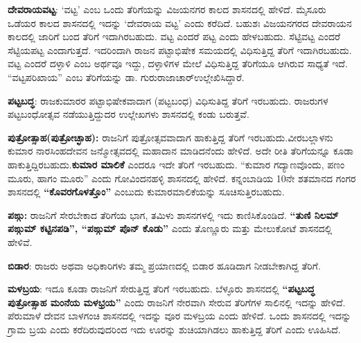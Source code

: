 \vskip 3pt

\textbf{ದೇವರಾಯವಟ್ಟ}: ‘ವಟ್ಟ’ ಎಂಬ ಒಂದು ತೆರಿಗೆಯನ್ನು ವಿಜಯನಗರ ಕಾಲದ ಶಾಸನದಲ್ಲಿ ಹೇಳಿದೆ. ಮೈಸೂರು ಒಡೆಯರ ಕಾಲದ ಶಾಸನದಲ್ಲಿ ಇದನ್ನು ‘ದೇವರಾಯ ವಟ್ಟ’ ಎಂದು ಕರೆದಿದೆ. ಬಹುಶಃ ವಿಜಯನಗರದ ದೇವರಾಯನ ಕಾಲದಲ್ಲಿ ಜಾರಿಗೆ ಬಂದ ತೆರಿಗೆ ಇದಾಗಿರಬಹುದು. ವಟ್ಟ ಎಂದರೆ ಪಟ್ಟ ಎಂದು ಹೇಳಬಹುದು. ಸೆಟ್ಟಿವಟ್ಟ ಎಂದರೆ ಸೆಟ್ಟಿಯಪಟ್ಟ ಎಂದಾಗುತ್ತದೆ. ಇದರಿಂದಾಗಿ ರಾಜನ ಪಟ್ಟಾಭಿಷೇಕ ಸಮಯದಲ್ಲಿ ವಿಧಿಸುತ್ತಿದ್ದ ತೆರಿಗೆ ಇದಾಗಿರಬಹುದು. ವಟ್ಟ ಎಂದರೆ ದಳ್ಳಾಳಿ ಎಂಬ ಅರ್ಥವೂ ಇದ್ದು, ದಳ್ಳಾಳಿಗಳ ಮೇಲೆ ವಿಧಿಸುತ್ತಿದ್ದ ತೆರಿಗೆಯೂ ಆಗಿರುವ ಸಾಧ್ಯತೆ ಇದೆ. “ವಟ್ಟಪರಿಖಾಯ” ಎಂಬ ತೆರಿಗೆಯನ್ನು ಡಾ. ಗುರುರಾಜಾಚಾರ್​ ಉಲ್ಲೇಖಿಸಿದ್ದಾರೆ.

\vskip 3pt

\textbf{ಪಟ್ಟಬದ್ಧ}: ರಾಜಕುಮಾರರ ಪಟ್ಟಾಭಿಷೇಕವಾದಾಗ (ಪಟ್ಟಬಂಧ) ವಿಧಿಸುತಿದ್ದ ತೆರಿಗೆ ಇರಬಹುದು. ರಾಜರುಗಳ ಪಟ್ಟಬಂಧೋತ್ಸವ ನಡೆಯುತ್ತಿದ್ದುದರ ಉಲ್ಲೇಖಗಳು ಶಾಸನದಲ್ಲಿ ಕಂಡು ಬರುತ್ತವೆ.

\vskip 3pt

\textbf{ಪುತ್ರೋತ್ಸಾಹ}\textbf{(ಪುತ್ರೋಚ್ಛಾಹ):} ರಾಜನಿಗೆ ಪುತ್ರೋತ್ಸವವಾದಾಗ ಹಾಕುತ್ತಿದ್ದ ತೆರಿಗೆ ಇರಬಹುದು.\break ವೀರಬಲ್ಲಾಳನು ಕುಮಾರ ನಾರಸಿಂಹದೇವನ ಜನ್ಮೋತ್ಸವದಲ್ಲಿ ಮಹಾದಾನ ಮಾಡಿದನೆಂದು ಹೇಳಿದೆ. ಅದೇ ರೀತಿ ತೆರಿಗೆಯನ್ನೂ ಕೂಡಾ ಹಾಕುತ್ತಿದ್ದಿರಬಹುದು.\textbf{ಕುಮಾರ ಮಾಲಿಕೆ} ಎಂದರೂ ಇದೇ ತೆರಿಗೆ ಇರಬಹುದು. “ಕುಮಾರ ಗದ್ಯಾಣವೊಂದು, ಪಣಂ ಮೂರು, ಹಾಗಂ ಮೂರು” ಎಂದು ಗೋವಿಂದನಹಳ್ಳಿ ಶಾಸನದಲ್ಲಿ ಹೇಳಿದೆ. ಕನ್ನಂಬಾಡಿಯ 10ನೇ ಶತಮಾನದ ಗಂಗರ ಶಾಸನದಲ್ಲಿ \textbf{“ಕೊವರಗೊಳತ್ತೊಂ”} ಎಂಬುದು ಕುಮಾರಮಾಲಿಕೆಯನ್ನು ಸೂಚಿಸುತ್ತಿರಬಹುದು.

\textbf{ಪಙ್ಗು:} ರಾಜನಿಗೆ ಸೇರಬೇಕಾದ ತೆರಿಗೆಯ ಭಾಗ, ತಮಿಳು ಶಾಸನಗಳಲ್ಲಿ ಇದು ಕಾಣಿಸಿಕೊಂಡಿದೆ. \textbf{“ತುಣಿ ನಿಲಮ್ ಪಙ್ಗುಮ್ ಕಟ್ಟಿನಪಡಿ”, “ಪಙ್ಗುಮ್ ಪೊನ್​ ಕೊಡು”} ಎಂದು ತೊಣ್ಣೂರು ಮತ್ತು ಮೇಲುಕೋಟೆ ಶಾಸನದಲ್ಲಿ ಹೇಳಿವೆ.

\textbf{ಬಿಡಾರ}: ರಾಜರು ಅಥವಾ ಅಧಿಕಾರಿಗಳು ತಮ್ಮ ಪ್ರಯಾಣದಲ್ಲಿ ಬಿಡಾರ ಹೂಡಿದಾಗ ನೀಡಬೇಕಾಗಿದ್ದ ತೆರಿಗೆ.

\textbf{ಮಳಬ್ರಯ}: ಇದೂ ಕೂಡಾ ರಾಜನಿಗೆ ಸೇರುತ್ತಿದ್ದ ತೆರಿಗೆ ಇರಬಹುದು. ಬೆಳ್ಳೂರು ಶಾಸನದಲ್ಲಿ \textbf{“ಪಟ್ಟಬದ್ಧ ಪುತ್ರೋತ್ಸಾಹ ಮಂನೆಯ ಮಳಭ್ರಯ”} ಎಂದು ರಾಜನಿಗೆ ನೇರವಾಗಿ ಸೇರುವ ತೆರಿಗೆಗಳ ಸಾಲಿನಲ್ಲಿ ಇದನ್ನು ಹೇಳಿದೆ. ಪೆರುಮಾಳೆ ದೇವನ ಬಾಳಗಂಚಿ ಶಾಸನದಲ್ಲಿ ಇದನ್ನು ವೂರ ಮಳಬ್ರಯ ಎಂದು ಹೇಳಿದೆ. ಒಂದು ಶಾಸನದಲ್ಲಿ ಇದನ್ನು ಗ್ರಾಮ ಬ್ರಯ ಎಂದು ಕರೆದಿರುವುದರಿಂದ ಇದು ಊರನ್ನು ಶುಚಿಯಾಗಿಡಲು ಹಾಕುತ್ತಿದ್ದ ತೆರಿಗೆ ಎಂದು ಊಹಿಸಿದೆ.

